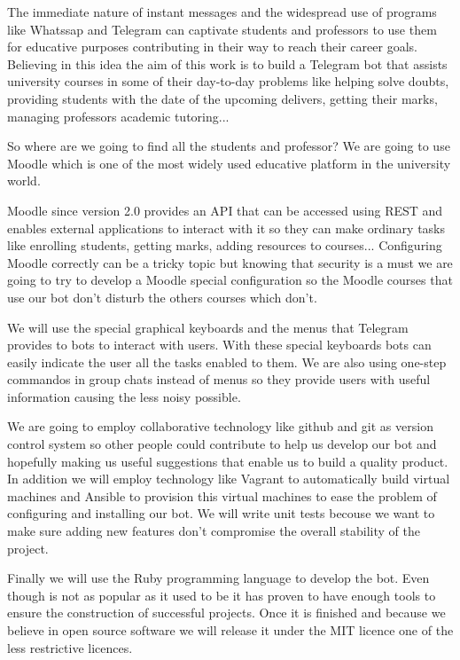 The immediate nature of instant messages and the widespread use of programs like Whatssap and Telegram can captivate students and professors to  use them for educative purposes contributing in their way to reach their career goals. Believing in this idea the aim of this work is to build a Telegram bot that assists university courses in some of their day-to-day problems like helping solve doubts, providing students with the date of the upcoming delivers, getting their marks, managing professors academic tutoring... 
\par
So where are we going to find all the students and professor? We are going to use Moodle which is one of the most widely used educative platform in the university world.
\par
Moodle since version 2.0 provides an API that can be accessed using REST and enables external applications to interact with it so they can  make ordinary tasks like enrolling students, getting marks, adding resources to courses... Configuring Moodle correctly can be a tricky topic but knowing that security is a must we are going to try to develop a Moodle special configuration so the Moodle courses that use our bot don't disturb the others courses which don't.
\par 
We will use the special graphical keyboards and the menus that Telegram provides to bots to interact with users. With these special keyboards bots can easily indicate the user all the tasks enabled to them. We are also using one-step commandos in group chats instead of menus so they provide users with useful information causing the less noisy possible.
\par
We are going to employ collaborative technology like github and git as version control system so other people could contribute to help us develop our bot and hopefully making us useful suggestions that enable us to build a quality product. In addition we will employ technology like Vagrant to automatically build virtual machines and Ansible to provision this virtual machines to ease the problem of configuring and installing our bot. We will write unit tests becouse we want to make sure adding new features don't compromise the overall stability of the project.
\par

Finally we will use the Ruby programming language to develop the bot. Even though is not as popular as it used to be it has proven to have enough tools to ensure the construction of successful projects. Once it is finished and  because we believe in open source software we will release it under the MIT licence one of the less restrictive licences. 


